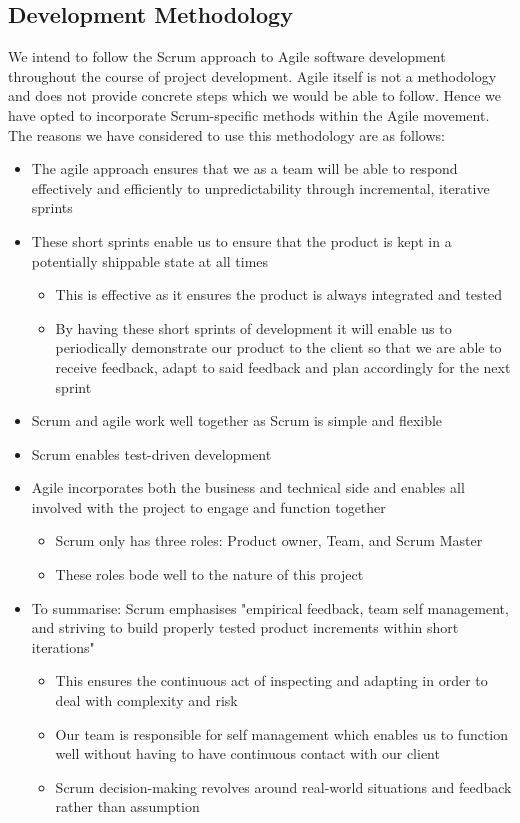 \documentclass{article}
\begin{document}
	\subsection{Development Methodology}
		We intend to follow the Scrum approach to Agile software development throughout the course of project development. Agile itself is not a methodology and does not provide concrete steps which we would be able to follow. Hence we have opted to incorporate Scrum-specific methods within the Agile movement. The reasons we have considered to use this methodology are as follows:
		\begin{itemize}
			\item The agile approach ensures that we as a team will be able to respond effectively and efficiently to unpredictability through incremental, iterative sprints
			\item These short sprints enable us to ensure that the product is kept in a potentially shippable state at all times
			\begin{itemize}
				\item This is effective as it ensures the product is always integrated and tested
				\item By having these short sprints of development it will enable us to periodically demonstrate our product to the client so that we are able to receive feedback, adapt to said feedback and plan accordingly for the next sprint
			\end{itemize}
			\item Scrum and agile work well together as Scrum is simple and flexible
			\item Scrum enables test-driven development
			\item Agile incorporates both the business and technical side and enables all involved with the project to engage and function together
			\begin{itemize}
				\item Scrum only has three roles: Product owner, Team, and Scrum Master
				\item These roles bode well to the nature of this project
			\end{itemize}
			\item To summarise: Scrum emphasises "empirical feedback, team self management, and striving to build properly tested product increments within short iterations"
			\begin{itemize}
				\item This ensures the continuous act of inspecting and adapting in order to deal with complexity and risk
				\item Our team is responsible for self management which enables us to function well without having to have continuous contact with our client
				\item Scrum decision-making revolves around real-world situations and feedback rather than assumption
			\end{itemize}
		\end{itemize}
\end{document}
